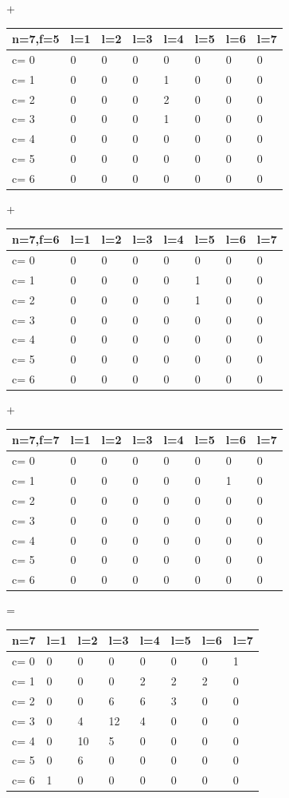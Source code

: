 +
\begin{tabular}{l | l l l l l l l}
\hline
n=7,f=5&l=1&l=2&l=3&l=4&l=5&l=6&l=7\\
\hline
c= 0& 0& 0& 0& 0& 0& 0& 0\\
c= 1& 0& 0& 0& 1& 0& 0& 0\\
c= 2& 0& 0& 0& 2& 0& 0& 0\\
c= 3& 0& 0& 0& 1& 0& 0& 0\\
c= 4& 0& 0& 0& 0& 0& 0& 0\\
c= 5& 0& 0& 0& 0& 0& 0& 0\\
c= 6& 0& 0& 0& 0& 0& 0& 0\\
\hline
\end{tabular}
+
\begin{tabular}{l | l l l l l l l}
\hline
n=7,f=6&l=1&l=2&l=3&l=4&l=5&l=6&l=7\\
\hline
c= 0& 0& 0& 0& 0& 0& 0& 0\\
c= 1& 0& 0& 0& 0& 1& 0& 0\\
c= 2& 0& 0& 0& 0& 1& 0& 0\\
c= 3& 0& 0& 0& 0& 0& 0& 0\\
c= 4& 0& 0& 0& 0& 0& 0& 0\\
c= 5& 0& 0& 0& 0& 0& 0& 0\\
c= 6& 0& 0& 0& 0& 0& 0& 0\\
\hline
\end{tabular}
+
\begin{tabular}{l | l l l l l l l}
\hline
n=7,f=7&l=1&l=2&l=3&l=4&l=5&l=6&l=7\\
\hline
c= 0& 0& 0& 0& 0& 0& 0& 0\\
c= 1& 0& 0& 0& 0& 0& 1& 0\\
c= 2& 0& 0& 0& 0& 0& 0& 0\\
c= 3& 0& 0& 0& 0& 0& 0& 0\\
c= 4& 0& 0& 0& 0& 0& 0& 0\\
c= 5& 0& 0& 0& 0& 0& 0& 0\\
c= 6& 0& 0& 0& 0& 0& 0& 0\\
\hline
\end{tabular}
=
\begin{tabular}{l | l l l l l l l}
\hline
n=7&l=1&l=2&l=3&l=4&l=5&l=6&l=7\\
\hline
c= 0& 0& 0& 0& 0& 0& 0& 1\\
c= 1& 0& 0& 0& 2& 2& 2& 0\\
c= 2& 0& 0& 6& 6& 3& 0& 0\\
c= 3& 0& 4& 12& 4& 0& 0& 0\\
c= 4& 0& 10& 5& 0& 0& 0& 0\\

c= 5& 0& 6& 0& 0& 0& 0& 0\\
c= 6& 1& 0& 0& 0& 0& 0& 0\\
\hline
\end{tabular}

